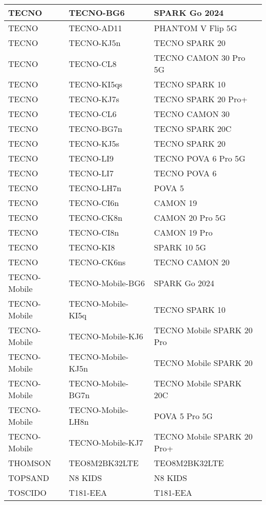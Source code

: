 \begin{tabularx}{\linewidth}{|l|X|X|}
        TECNO & TECNO-BG6 & SPARK Go 2024 \\ \hline
        TECNO & TECNO-AD11 & PHANTOM V Flip 5G \\ \hline
        TECNO & TECNO-KJ5n & TECNO SPARK 20 \\ \hline
        TECNO & TECNO-CL8 & TECNO CAMON 30 Pro 5G \\ \hline
        TECNO & TECNO-KI5qs & TECNO SPARK 10 \\ \hline
        TECNO & TECNO-KJ7s & TECNO SPARK 20 Pro+ \\ \hline
        TECNO & TECNO-CL6 & TECNO CAMON 30 \\ \hline
        TECNO & TECNO-BG7n & TECNO SPARK 20C \\ \hline
        TECNO & TECNO-KJ5s & TECNO SPARK 20 \\ \hline
        TECNO & TECNO-LI9 & TECNO POVA 6 Pro 5G \\ \hline
        TECNO & TECNO-LI7 & TECNO POVA 6 \\ \hline
        TECNO & TECNO-LH7n & POVA 5 \\ \hline
        TECNO & TECNO-CI6n & CAMON 19 \\ \hline
        TECNO & TECNO-CK8n & CAMON 20 Pro 5G \\ \hline
        TECNO & TECNO-CI8n & CAMON 19 Pro \\ \hline
        TECNO & TECNO-KI8 & SPARK 10 5G \\ \hline
        TECNO & TECNO-CK6ns & TECNO CAMON 20 \\ \hline
        TECNO-Mobile & TECNO-Mobile-BG6 & SPARK Go 2024 \\ \hline
        TECNO-Mobile & TECNO-Mobile-KI5q & TECNO SPARK 10 \\ \hline
        TECNO-Mobile & TECNO-Mobile-KJ6 & TECNO Mobile SPARK 20 Pro \\ \hline
        TECNO-Mobile & TECNO-Mobile-KJ5n & TECNO Mobile SPARK 20 \\ \hline
        TECNO-Mobile & TECNO-Mobile-BG7n & TECNO Mobile SPARK 20C \\ \hline
        TECNO-Mobile & TECNO-Mobile-LH8n & POVA 5 Pro 5G \\ \hline
        TECNO-Mobile & TECNO-Mobile-KJ7 & TECNO Mobile SPARK 20 Pro+ \\ \hline
        THOMSON & TEO8M2BK32LTE & TEO8M2BK32LTE \\ \hline
        TOPSAND & N8 KIDS & N8 KIDS \\ \hline
        TOSCIDO & T181-EEA & T181-EEA \\ \hline

\end{tabularx}
